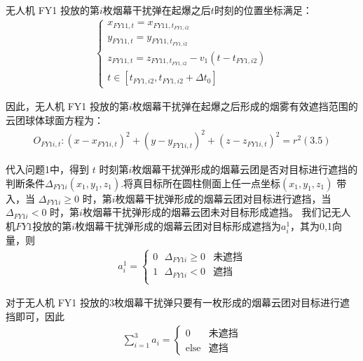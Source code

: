 \documentclass[../main.tex]{subfiles}
\begin{document}
\begin{itemize}
\begin{align}
\end{align}
\par 无人机 FY1 投放的第$i$枚烟幕干扰弹在起爆之后$t$时刻的位置坐标满足：
\begin{align}\label{11.9}
	\left\{ \begin{array}{l}
	x_{FY11,t}=x_{FY11,t_{FY1,i2}}\\
	y_{FY11,t}=y_{FY11,t_{FY1,i2}}\\
	z_{FY11,t}=z_{FY11,t_{FY1,i2}}-v_1\left( t-t_{FY1,i2} \right)\\
	t\in \left[ t_{FY1,i2},t_{FY1,i2}+\Delta t_0 \right]
\end{array} \right.
\end{align}
\par 因此，无人机 FY1 投放的第$i$枚烟幕干扰弹在起爆之后形成的烟雾有效遮挡范围的云团球体球面方程为：
\begin{align}
	O_{FY1i,t}:\left( x-x_{FY1i,t} \right) ^2+\left( y-y_{FY1i,t} \right) ^2+\left( z-z_{FY1i,t} \right) ^2=r^2\left( 3.5 \right) 
\end{align}
\par 代入问题1中，得到 $t$ 时刻第$i$枚烟幕干扰弹形成的烟幕云团是否对目标进行遮挡的判断条件$\Delta _{FY1i}\left( x_1,y_1,z_1 \right) $.将真目标所在圆柱侧面上任一点坐标$(x_1, y_1, z_1)$ 带入，当 $\Delta _{FY1i} \geq 0$ 时，第$i$枚烟幕干扰弹形成的烟幕云团对目标进行遮挡，当 $\Delta _{FY1i} < 0$ 时，第$i$枚烟幕干扰弹形成的烟幕云团未对目标形成遮挡。 我们记无人机$FY1$投放的第$i$枚烟幕干扰弹形成的烟幕云团对目标形成遮挡为$a_{i}^{1}$，其为0,1向量，则
\begin{align}
a_{i}^{1}=\begin{cases}
	0\ \ \ \Delta _{FY1i}\geq 0&		\text{未遮挡}\\
	1\ \ \ \Delta _{FY1i}<0&		\text{遮挡}\\
\end{cases}
\end{align}\label{11.7}
\par 对于无人机 FY1 投放的3枚烟幕干扰弹只要有一枚形成的烟幕云团对目标进行遮挡即可，因此
\begin{align}
\sum_{i=1}^{3} a_i = 
\begin{cases} 
0 & \text{未遮挡} \\
\text{else} & \text{遮挡}
\end{cases}
\end{align}




\end{itemize}
\end{document}

